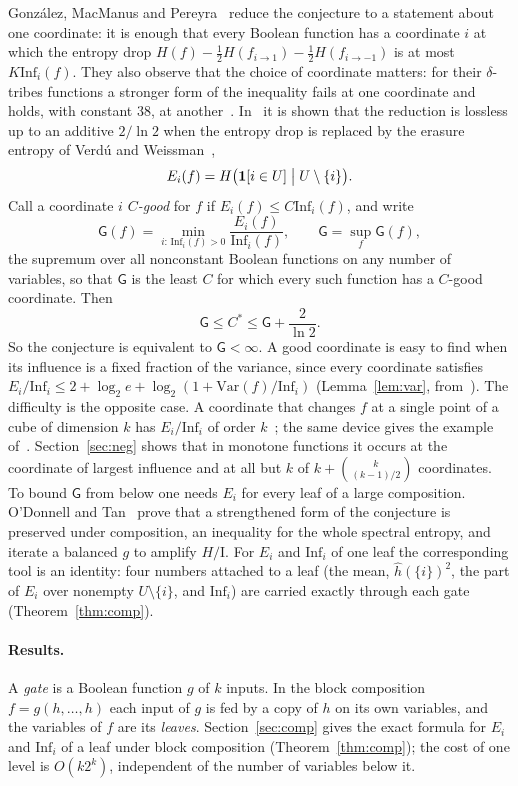 \documentclass[11pt]{amsart}
\theoremstyle{definition}
\theoremstyle{remark}
\newcommand{\Inf}{\mathrm{Inf}}
\newcommand{\G}{\mathsf{G}}
\begin{document}
Gonz\'alez, MacManus and Pereyra~\cite{GMP} reduce the conjecture to a statement about one coordinate: it is enough
that every Boolean function has a coordinate $i$ at which the entropy drop
$H(f)-\tfrac12H(f_{i\to1})-\tfrac12H(f_{i\to-1})$ is at most $K\Inf_i(f)$. They also observe that the choice of
coordinate matters: for their $\delta$-tribes functions a stronger form of the inequality fails at one coordinate
and holds, with constant $38$, at another~\cite[Section~5]{GMP}. In~\cite{Shm2} it is shown that the reduction is
lossless up to an additive $2/\ln 2$ when the entropy drop is replaced by the erasure entropy of Verd\'u and
Weissman~\cite{VW08},
\[
E_i(f)=H\bigl(\mathbf 1[i\in U]\bigm| U\setminus\{i\}\bigr).
\]
Call a coordinate $i$ \emph{$C$-good} for $f$ if $E_i(f)\le C\Inf_i(f)$, and write
\[
\G(f)=\min_{i:\,\Inf_i(f)>0}\frac{E_i(f)}{\Inf_i(f)},\qquad \G=\sup_f\G(f),
\]
the supremum over all nonconstant Boolean functions on any number of variables, so that $\G$ is the least $C$ for
which every such function has a $C$-good coordinate. Then
\[
\G\le C^\ast\le\G+\frac{2}{\ln 2}.
\]
So the conjecture is equivalent to $\G<\infty$. A good coordinate is easy to find when its influence is a fixed
fraction of the variance, since every coordinate satisfies $E_i/\Inf_i\le2+\log_2e+\log_2(1+\mathrm{Var}(f)/\Inf_i)$
(Lemma~\ref{lem:var}, from~\cite{ShmVar}). The difficulty is the opposite case. A coordinate that changes $f$ at a
single point of a cube of dimension $k$ has $E_i/\Inf_i$ of order $k$~\cite[Proposition~7]{Shm2}; the same device
gives the example of~\cite[Proposition~5.1]{GMP}. Section~\ref{sec:neg} shows that in monotone functions it occurs at
the coordinate of largest influence and at all but $k$ of $k+\binom{k}{(k-1)/2}$ coordinates. To bound $\G$ from
below one needs $E_i$ for every leaf of a large composition. O'Donnell and Tan~\cite{OT13} prove that a strengthened
form of the conjecture is preserved under composition, an inequality for the whole spectral entropy, and iterate a
balanced $g$ to amplify $H/\mathrm I$. For $E_i$ and $\Inf_i$ of one leaf the corresponding tool is an identity: four
numbers attached to a leaf (the mean, $\hat h(\{i\})^2$, the part of $E_i$ over nonempty $U\setminus\{i\}$, and
$\Inf_i$) are carried exactly through each gate (Theorem~\ref{thm:comp}).

\paragraph{Results.}
A \emph{gate} is a Boolean function $g$ of $k$ inputs. In the block composition $f=g(h,\dots,h)$ each input of $g$
is fed by a copy of $h$ on its own variables, and the variables of $f$ are its \emph{leaves}.
Section~\ref{sec:comp} gives the exact formula for $E_i$ and $\Inf_i$ of a leaf under block composition
(Theorem~\ref{thm:comp}); the cost of one level is $O(k2^k)$, independent of the number of variables below it.
\end{document}
